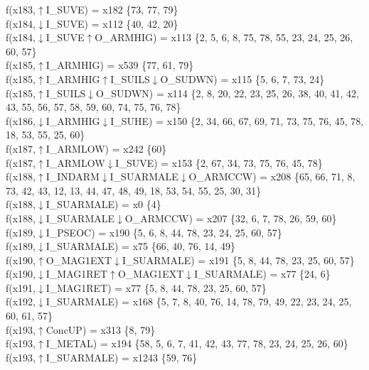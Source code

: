 f(x183,$\uparrow$I\_SUVE) = x182 \{73, 77, 79\} \\  
f(x184,$\downarrow$I\_SUVE) = x112 \{40, 42, 20\} \\  
f(x184,$\downarrow$I\_SUVE$\uparrow$O\_ARMHIG) = x113 \{2, 5, 6, 8, 75, 78, 55, 23, 24, 25, 26, 60, 57\} \\  
f(x185,$\uparrow$I\_ARMHIG) = x539 \{77, 61, 79\} \\  
f(x185,$\uparrow$I\_ARMHIG$\uparrow$I\_SUILS$\downarrow$O\_SUDWN) = x115 \{5, 6, 7, 73, 24\} \\  
f(x185,$\uparrow$I\_SUILS$\downarrow$O\_SUDWN) = x114 \{2, 8, 20, 22, 23, 25, 26, 38, 40, 41, 42, 43, 55, 56, 57, 58, 59, 60, 74, 75, 76, 78\} \\  
f(x186,$\downarrow$I\_ARMHIG$\downarrow$I\_SUHE) = x150 \{2, 34, 66, 67, 69, 71, 73, 75, 76, 45, 78, 18, 53, 55, 25, 60\} \\  
f(x187,$\uparrow$I\_ARMLOW) = x242 \{60\} \\  
f(x187,$\uparrow$I\_ARMLOW$\downarrow$I\_SUVE) = x153 \{2, 67, 34, 73, 75, 76, 45, 78\} \\  
f(x188,$\uparrow$I\_INDARM$\downarrow$I\_SUARMALE$\downarrow$O\_ARMCCW) = x208 \{65, 66, 71, 8, 73, 42, 43, 12, 13, 44, 47, 48, 49, 18, 53, 54, 55, 25, 30, 31\} \\  
f(x188,$\downarrow$I\_SUARMALE) = x0 \{4\} \\  
f(x188,$\downarrow$I\_SUARMALE$\downarrow$O\_ARMCCW) = x207 \{32, 6, 7, 78, 26, 59, 60\} \\  
f(x189,$\downarrow$I\_PSEOC) = x190 \{5, 6, 8, 44, 78, 23, 24, 25, 60, 57\} \\  
f(x189,$\downarrow$I\_SUARMALE) = x75 \{66, 40, 76, 14, 49\} \\  
f(x190,$\uparrow$O\_MAG1EXT$\downarrow$I\_SUARMALE) = x191 \{5, 8, 44, 78, 23, 25, 60, 57\} \\  
f(x190,$\downarrow$I\_MAG1RET$\uparrow$O\_MAG1EXT$\downarrow$I\_SUARMALE) = x77 \{24, 6\} \\  
f(x191,$\downarrow$I\_MAG1RET) = x77 \{5, 8, 44, 78, 23, 25, 60, 57\} \\  
f(x192,$\downarrow$I\_SUARMALE) = x168 \{5, 7, 8, 40, 76, 14, 78, 79, 49, 22, 23, 24, 25, 60, 61, 57\} \\  
f(x193,$\uparrow$ConcUP) = x313 \{8, 79\} \\  
f(x193,$\uparrow$I\_METAL) = x194 \{58, 5, 6, 7, 41, 42, 43, 77, 78, 23, 24, 25, 26, 60\} \\  
f(x193,$\uparrow$I\_SUARMALE) = x1243 \{59, 76\} \\  
